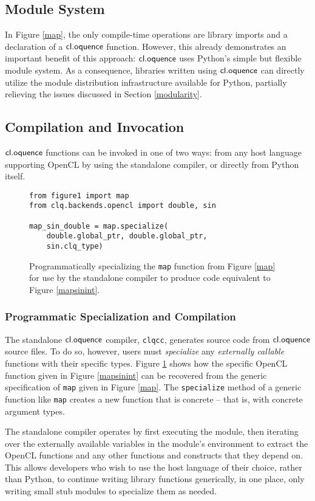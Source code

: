 \documentclass[10pt, conference, compsocconf]{IEEEtran}
\begin{document}
\subsection{Module System}
In Figure \ref{map}, the only compile-time operations are library imports and a declaration of a $\textsf{cl.oquence}$ function. However, this already demonstrates an important benefit of this approach: $\textsf{cl.oquence}$ uses Python's simple but flexible module system. As a consequence, libraries written using $\textsf{cl.oquence}$ can directly utilize the module distribution infrastructure available for Python, partially relieving the issues discussed in Section \ref{modularity}.

\subsection{Compilation and Invocation}
$\textsf{cl.oquence}$ functions can be invoked in one of two ways: from any host language supporting OpenCL by using the standalone compiler, or directly from Python itself. 
\begin{figure}\small{\begin{verbatim}
from figure1 import map
from clq.backends.opencl import double, sin

map_sin_double = map.specialize(
    double.global_ptr, double.global_ptr, 
    sin.clq_type)
\end{verbatim}}
\caption{Programmatically specializing the \texttt{map} function from Figure \ref{map} for use by the standalone compiler to produce code equivalent to Figure \ref{mapsinint}.}
\label{specialization}
\end{figure}


\subsubsection{Programmatic Specialization and Compilation}
The standalone $\textsf{cl.oquence}$ compiler, \verb|clqcc|, generates source code from $\textsf{cl.oquence}$ source files. To do so, however, users must {\it specialize} any {\it externally callable} functions with their specific types. Figure \ref{specialization} shows how the specific OpenCL function given in Figure \ref{mapsinint} can be recovered from the generic specification of \verb|map| given in Figure \ref{map}. The \verb|specialize| method of a generic function like \verb|map| creates a new function that is concrete -- that is, with concrete argument types.

The standalone compiler operates by first executing the module, then iterating over the externally available variables in the module's environment to extract the OpenCL functions and any other functions and constructs that they depend on. This allows developers who wish to use the host language of their choice, rather than Python, to continue writing library functions generically, in one place, only writing small stub modules to specialize them as needed.
\end{document}
